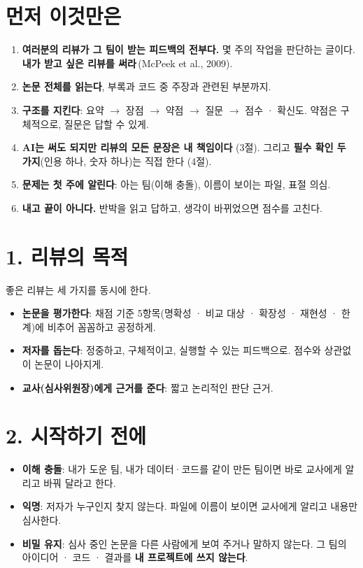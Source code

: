 \documentclass[11pt]{article}
\begin{document}


\section*{먼저 이것만은}
\begin{enumerate}
\item \textbf{여러분의 리뷰가 그 팀이 받는 피드백의 전부다.} 몇 주의 작업을 판단하는 글이다. \textbf{내가 받고 싶은 리뷰를 써라}\,(McPeek et al., 2009).
\item \textbf{논문 전체를 읽는다}, 부록과 코드 중 주장과 관련된 부분까지.
\item \textbf{구조를 지킨다}: 요약 $\to$ 장점 $\to$ 약점 $\to$ 질문 $\to$ 점수 · 확신도. 약점은 구체적으로, 질문은 답할 수 있게.
\item \textbf{AI는 써도 되지만 리뷰의 모든 문장은 내 책임이다} (3절). 그리고 \textbf{필수 확인 두 가지}(인용 하나, 숫자 하나)는 직접 한다 (4절).
\item \textbf{문제는 첫 주에 알린다}: 아는 팀(이해 충돌), 이름이 보이는 파일, 표절 의심.
\item \textbf{내고 끝이 아니다.} 반박을 읽고 답하고, 생각이 바뀌었으면 점수를 고친다.
\end{enumerate}

\section*{1. 리뷰의 목적}
좋은 리뷰는 세 가지를 동시에 한다.
\begin{itemize}
\item \textbf{논문을 평가한다}: 채점 기준 5항목(명확성 · 비교 대상 · 확장성 · 재현성 · 한계)에 비추어 꼼꼼하고 공정하게.
\item \textbf{저자를 돕는다}: 정중하고, 구체적이고, 실행할 수 있는 피드백으로. 점수와 상관없이 논문이 나아지게.
\item \textbf{교사(심사위원장)에게 근거를 준다}: 짧고 논리적인 판단 근거.
\end{itemize}

\section*{2. 시작하기 전에}
\begin{itemize}
\item \textbf{이해 충돌}: 내가 도운 팀, 내가 데이터·코드를 같이 만든 팀이면 바로 교사에게 알리고 바꿔 달라고 한다.
\item \textbf{익명}: 저자가 누구인지 찾지 않는다. 파일에 이름이 보이면 교사에게 알리고 내용만 심사한다.
\item \textbf{비밀 유지}: 심사 중인 논문을 다른 사람에게 보여 주거나 말하지 않는다. 그 팀의 아이디어 · 코드 · 결과를 \textbf{내 프로젝트에 쓰지 않는다}.
\end{itemize}
\end{document}

